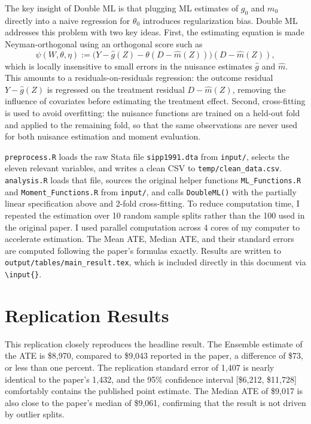 \documentclass[12pt]{article}
\begin{document}
The key insight of Double ML is that plugging ML estimates of $g_0$ and $m_0$
directly into a naive regression for $\theta_0$ introduces regularization bias.
Double ML addresses this problem with two key ideas. First, the estimating
equation is made Neyman-orthogonal using an orthogonal score such as
\begin{equation}
    \psi(W,\theta,\eta) := \bigl(Y - \hat{g}(Z) - \theta(D -
        \hat{m}(Z))\bigr)(D - \hat{m}(Z)), \label{eq:score}
\end{equation}
which is locally insensitive to small errors in the nuisance estimates
$\hat{g}$ and $\hat{m}$. This amounts to a residuals-on-residuals
regression: the outcome residual $Y - \hat{g}(Z)$ is regressed on the
treatment residual $D - \hat{m}(Z)$, removing the influence of covariates
before estimating the treatment effect. Second, cross-fitting is used to
avoid overfitting: the nuisance functions are trained on a held-out fold
and applied to the remaining fold, so that the same observations are never
used for both nuisance estimation and moment evaluation.

\texttt{preprocess.R} loads the raw Stata file \texttt{sipp1991.dta} from
\texttt{input/}, selects the eleven relevant variables, and writes a clean
CSV to \texttt{temp/clean\_data.csv}. \texttt{analysis.R} loads that file,
sources the original helper functions \texttt{ML\_Functions.R} and
\texttt{Moment\_Functions.R} from \texttt{input/}, and calls
\texttt{DoubleML()} with the partially linear specification above and 2-fold
cross-fitting. To reduce computation time, I repeated the estimation over
10 random sample splits rather than the 100 used in the original paper.
I used parallel computation across 4 cores of my computer to accelerate
estimation. The Mean ATE, Median ATE, and their standard errors are computed
following the paper's formulas exactly. Results are written to
\texttt{output/tables/main\_result.tex}, which is included directly in this
document via \texttt{\textbackslash input\{\}}.

\section{Replication Results}





\noindent This replication closely reproduces the headline result. The
Ensemble estimate of the ATE is \$8,970, compared to \$9,043 reported in
the paper, a difference of \$73, or less than one percent. The
replication standard error of 1,407 is nearly identical to the
paper's 1,432, and the 95\% confidence interval [\$6,212, \$11,728]
comfortably contains the published point estimate. The Median ATE of
\$9,017 is also close to the paper's median of \$9,061, confirming that the
result is not driven by outlier splits.
\end{document}
